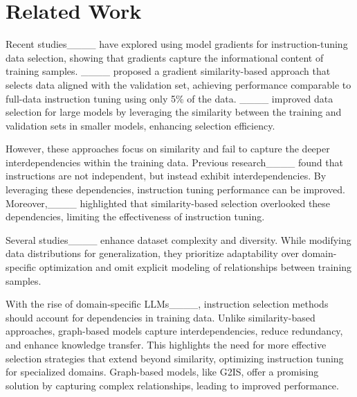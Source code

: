 \section{Related Work}
Recent studies____ have explored using model gradients for instruction-tuning data selection, showing that gradients capture the informational content of training samples.
____ proposed a gradient similarity-based approach that selects data aligned with the validation set, achieving performance comparable to full-data instruction tuning using only 5\% of the data.
____ improved data selection for large models by leveraging the similarity between the training and validation sets in smaller models, enhancing selection efficiency.

However, these approaches focus on similarity and fail to capture the deeper interdependencies within the training data. Previous research____ found that instructions are not independent, but instead exhibit interdependencies. By leveraging these dependencies, instruction tuning performance can be improved. Moreover,____ highlighted that similarity-based selection overlooked these dependencies, limiting the effectiveness of instruction tuning.


Several studies____ enhance dataset complexity and diversity.
While modifying data distributions for generalization, they prioritize adaptability over domain-specific optimization and omit explicit modeling of relationships between training samples.

With the rise of domain-specific LLMs____, instruction selection methods should account for dependencies in training data.
Unlike similarity-based approaches, graph-based models capture interdependencies, reduce redundancy, and enhance knowledge transfer.
This highlights the need for more effective selection strategies that extend beyond similarity, optimizing instruction tuning for specialized domains.
Graph-based models, like G2IS, offer a promising solution by capturing complex relationships, leading to improved performance.